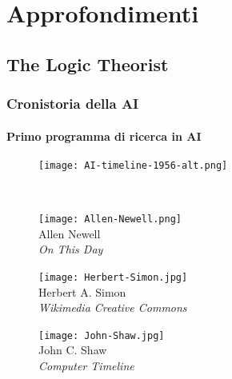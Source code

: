 \section{Approfondimenti}
\label{sec:appendix}
%
\subsection{The Logic Theorist}
\label{subsec:logic-theorist}
%
\begin{frame}[t,fragile] \frametitle{Cronistoria della AI}
{\scriptsize
{}
\framesubtitle{Primo programma di ricerca in AI}
\vspace*{-.5cm}
	\begin{minipage}[t]{\textwidth}
		\begin{figure}[ht]
			\centering
			\texttt{[image: AI-timeline-1956-alt.png]}
		\end{figure}
	\end{minipage}
	\\\vspace*{.3cm}
	\onslide<1->
	\begin{minipage}[b]{\textwidth}
		\begin{minipage}[b]{0.32\textwidth}
			\centering
			\begin{figure}[ht]
				\texttt{[image: Allen-Newell.png]}
				{\tiny\\Allen Newell\\\textit{\textcopyright On This Day}}
			\end{figure}
		\end{minipage}
		\begin{minipage}[b]{0.32\textwidth}
			\centering
			\begin{figure}[ht]
				\texttt{[image: Herbert-Simon.jpg]}
				{\tiny\\Herbert A. Simon\\\textit{\textcopyright Wikimedia Creative Commons}}
			\end{figure}
		\end{minipage}
		\begin{minipage}[b]{0.32\textwidth}
			\centering
			\begin{figure}[ht]
				\texttt{[image: John-Shaw.jpg]}
				{\tiny\\John C. Shaw\\\textit{\textcopyright Computer Timeline}}
			\end{figure}
		\end{minipage}

\end{minipage}}
\end{frame}
